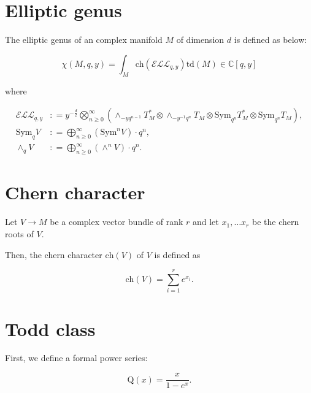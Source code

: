 \documentclass[uplatex,dvipdfmx]{jsarticle}
\newcommand{\defeq}{\mathrel{\mathop:}=}
\newcommand{\Sym}{\mathrm{Sym}}
\newcommand{\ch}[1]{\mathrm{ch}\left( {#1} \right)}
\newcommand{\td}[1]{\mathrm{td}\left( {#1} \right)}
\begin{document}
\section{Elliptic genus}

The elliptic genus of an complex manifold 
$M$
of dimension 
$d$
is defined as below:

\begin{equation}
    \chi(M, q, y)
    =
    \int_M
    \ch{\mathcal{ELL}_{q,y}}
    \td{M}
    \in
    \mathbb{C}[ q, y ]
\end{equation}

where

\begin{align}
    \mathcal{ELL}_{q, y}
    &\defeq
    y^{- \frac{d}{2}}
    \bigotimes_{n \geq 0}^{\infty}
    \left( 
        \wedge_{-yq^{n-1}} T_M^*
        \otimes
        \wedge_{-y^{-1}q^n} T_M
        \otimes
        \Sym_{q^n} T_M^*
        \otimes
        \Sym_{q^n}T_M
    \right), \\
    \Sym_q V
    &\defeq
    \bigoplus_{n \geq 0} ^{\infty}
    \left( 
        \Sym^n V
    \right)
    \cdot
    q^n, \\
    \wedge_q V
    &\defeq
    \bigoplus_{n \geq 0}^{\infty}
    \left( 
        \wedge^n V
    \right)
    \cdot
    q^n.
\end{align}

\section{Chern character}

Let 
$V \to M$ 
be a complex vector bundle of rank 
$r$
and let
$x_1, \ldots x_r$
be the chern roots of
$V$.

Then, the chern character 
$\ch{V}$ 
of 
$V$ 
is defined as

\begin{equation}
    \ch{V} 
    = 
    \sum_{i=1}^{r}
    e^{x_i}.
\end{equation}


\section{Todd class}

First, we define a formal power series:

\begin{equation}
    \mathrm{Q}(x)
    =
    \frac{x}{1 - e^x}.
\end{equation}
\end{document}
